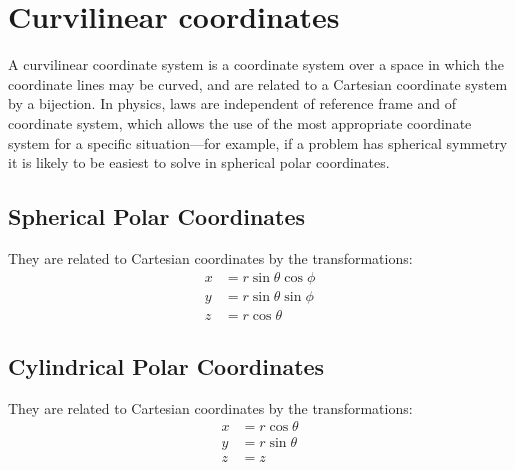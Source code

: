 \section{Curvilinear coordinates}
\label{sec:curvi}

A curvilinear coordinate system is a coordinate system over a space in
which the coordinate lines may be curved, and are related to a
Cartesian coordinate system by a bijection.  In physics, laws are
independent of reference frame and of coordinate system, which allows
the use of the most appropriate coordinate system for a specific
situation---for example, if a problem has spherical symmetry it is
likely to be easiest to solve in spherical polar coordinates.

\subsection{Spherical Polar Coordinates}
\label{sec:sphpol}

\begin{minipage}[!]{\linewidth}
  \noindent\begin{minipage}[!]{0.45\linewidth}
    
  \end{minipage}
  \hfill
  \noindent\begin{minipage}[!]{0.45\linewidth}
    They are related to Cartesian coordinates by the transformations:
    \begin{align}
      x &= r \sin \theta \cos \phi \label{eq:sph1}\\
      y &= r \sin \theta \sin \phi \label{eq:sph2}\\
      z &= r \cos \theta \label{eq:sph3}
    \end{align}
    \hfill \vfill
  \end{minipage}
\end{minipage}

\subsection{Cylindrical Polar Coordinates}
\label{sec:cylpol}
\begin{minipage}[!]{\linewidth}
  \noindent\begin{minipage}[!]{0.45\linewidth}
    
  \end{minipage}
  \hfill
  \noindent\begin{minipage}[!]{0.45\linewidth}
    They are related to Cartesian coordinates by the transformations:
    \begin{align}
      x &= r \cos \theta \label{eq:cyl1}\\
      y &= r \sin \theta \label{eq:cyl2}\\
      z &= z \label{eq:cyl3}
    \end{align}
    \hfill \vfill
  \end{minipage}
\end{minipage}

